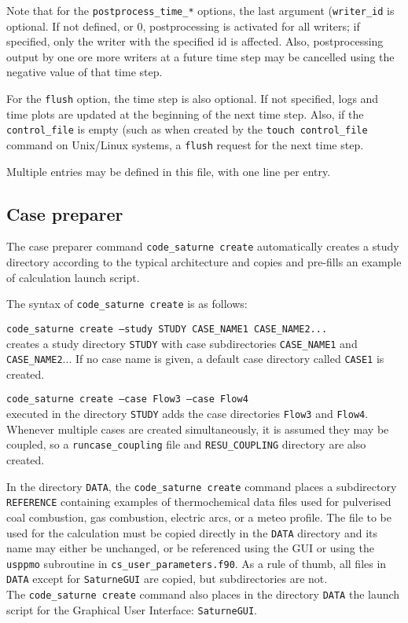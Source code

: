 {{{{{Note that for the \texttt{postprocess\_time\_*} options, the last argument
(\texttt{writer\_id}} is optional. If not defined, or 0, postprocessing
is activated for all writers; if specified, only the writer with the specified
id is affected. Also, postprocessing output by one ore more writers at a
future time step may be cancelled using the negative value of that time step.

For the \texttt{flush} option, the time step is also optional. If not
specified, logs and time plots are updated at the beginning of the
next time step. Also, if the \texttt{control\_file} is empty (such as
when created by the \texttt{touch control\_file} command on Unix/Linux
systems, a \texttt{flush} request for the next time step.

Multiple entries may be defined in this file, with one line per entry.

\subsection{Case preparer}
\label{sec:prg_cscreate}%
The case preparer command \texttt{code\_saturne~create} automatically creates a
study directory according to the typical architecture and copies and
pre-fills an example of calculation launch script.

The syntax of \texttt{code\_saturne~create} is as follows:

\noindent
\texttt{code\_saturne~create --study STUDY CASE\_NAME1 CASE\_NAME2...}\\
creates a study directory \texttt{STUDY} with case subdirectories
\texttt{CASE\_NAME1} and \texttt{CASE\_NAME2}...
If no case name is given, a default case directory called \texttt{CASE1} is
created.

\noindent
\texttt{code\_saturne~create --case Flow3 --case Flow4}\\
executed in the directory \texttt{STUDY} adds the case directories
\texttt{Flow3} and \texttt{Flow4}. Whenever multiple cases are created simultaneously, it is assumed they may be coupled, so a \texttt{runcase\_coupling} file and \texttt{RESU\_COUPLING} directory are also created.

In the directory \texttt{DATA}, the \texttt{code\_saturne~create} command
places a subdirectory \texttt{REFERENCE} containing examples of thermochemical
data files used for pulverised coal combustion, gas combustion, electric arcs, or
a meteo profile. The file to be used for the calculation must be copied directly
in the \texttt{DATA} directory and its name may either be unchanged, or
be referenced using the GUI or using the \texttt{usppmo} subroutine in
\texttt{cs\_user\_parameters.f90}. As a rule of thumb, all files in \texttt{DATA}
except for \texttt{SaturneGUI} are copied, but subdirectories are not.\\
The \texttt{code\_saturne~create} command also places in the directory
\texttt{DATA} the launch script for the Graphical User Interface:
\texttt{SaturneGUI}.

}}}}
